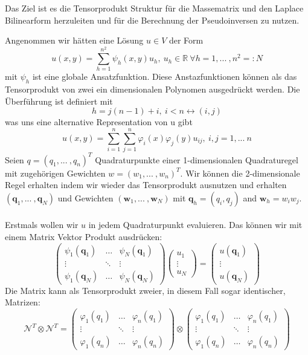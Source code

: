 Das Ziel ist es die Tensorprodukt Struktur für die Massematrix und den Laplace Bilinearform herzuleiten und für die Berechnung der Pseudoinversen zu nutzen. 

Angenommen wir hätten eine Lösung $u \in V$ der Form
\begin{equation}
u(x,y)=\sum_{h=1}^{n^2} \psi_h (x,y) u_h,\ u_h \in \mathbb{R} \ \forall h =1,...\ ,n^2=:N
\end{equation}
mit $\psi_h$ ist eine globale Ansatzfunktion. Diese Anstazfunktionen können als das Tensorprodukt von zwei ein dimensionalen Polynomen ausgedrückt werden. Die Überführung ist definiert mit
\begin{equation}
h=j(n-1)+i,\ i<n \leftrightarrow (i,j)
\end{equation}
was uns eine alternative Representation von u gibt
\begin{equation}
u(x,y)=\sum_{i=1}^n \sum_{j=1}^n \varphi_i(x) \varphi_j(y) u_{ij}, \ i,j =1,...\ n
\end{equation}
Seien $q=(q_1,...\ ,q_n)^T$ Quadraturpunkte einer 1-dimensionalen Quadraturegel mit zugehörigen Gewichten $w=(w_1,...\ ,w_n)^T$. Wir können die 2-dimensionale Regel erhalten indem wir wieder das Tensorprodukt ausnutzen und erhalten  $(\bm{q}_1,...\ ,\bm{q}_N)$ und Gewichten $(\bm{w}_1,...\ ,\bm{w}_N)$ mit $\bm{q}_h=(q_i,q_j)$ and $\bm{w}_h=w_i w_j$.\\ \\
Erstmals wollen wir $u$ in jedem Quadraturpunkt evaluieren. Das können wir mit einem Matrix Vektor Produkt ausdrücken:
\begin{equation}
\begin{pmatrix}
\psi_1(\bm{q}_1) & \hdots & \psi_N(\bm{q}_1) \\
\vdots & \ddots & \vdots \\
\psi_1(\bm{q}_N) & \hdots & \psi_N(\bm{q}_N)
\end{pmatrix}
\begin{pmatrix}
u_1 \\
\vdots \\
u_N
\end{pmatrix}
=
\begin{pmatrix}
u(\bm{q}_1) \\
\vdots \\
u(\bm{q}_N)
\end{pmatrix}
\end{equation}
Die Matrix kann als Tensorprodukt zweier, in diesem Fall sogar identischer, Matrizen:
\begin{equation}
\mathcal{N}^T \otimes \mathcal{N}^T =
\begin{pmatrix}
\varphi_1(q_1) & \hdots & \varphi_n(q_1) \\
\vdots & \ddots & \vdots \\
\varphi_1(q_n) & \hdots & \varphi_n(q_n)
\end{pmatrix}
\otimes
\begin{pmatrix}
\varphi_1(q_1) & \hdots & \varphi_n(q_1) \\
\vdots & \ddots & \vdots \\
\varphi_1(q_n) & \hdots & \varphi_n(q_n)
\end{pmatrix}
\end{equation}
